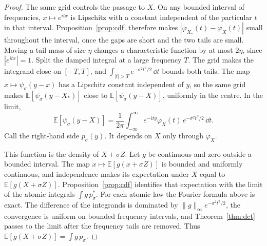 \begin{proof}
The same grid controls the passage to $X$. On any bounded interval of frequencies, $x\mapsto e^{itx}$ is Lipschitz with a constant independent of the particular $t$ in that interval. Proposition~\ref{prop:cdf} therefore makes $|\varphi_{X_*}(t)-\varphi_X(t)|$ small throughout the interval, once the gaps are short and the two tails are small. Moving a tail mass of size $\eta$ changes a characteristic function by at most $2\eta$, since $|e^{itx}|=1$. Split the damped integral at a large frequency $T$. The grid makes the integrand close on $[-T,T]$, and $\int_{|t|>T}e^{-\sigma^2 t^2/2}\,\dd t$ bounds both tails. The map $x\mapsto\psi_\sigma(y-x)$ has a Lipschitz constant independent of $y$, so the same grid makes $\mathbb E[\psi_\sigma(y-X_*)]$ close to $\mathbb E[\psi_\sigma(y-X)]$, uniformly in the centre. In the limit,
\[
 \mathbb E[\psi_\sigma(y-X)]
 =\frac1{2\pi}\int_{-\infty}^{\infty}e^{-ity}\varphi_X(t)\,e^{-\sigma^2 t^2/2}\,\dd t.
\]
Call the right-hand side $p_\sigma(y)$. It depends on $X$ only through $\varphi_X$.

This function is the density of $X+\sigma Z$. Let $g$ be continuous and zero outside a bounded interval. The map $x\mapsto\mathbb E[g(x+\sigma Z)]$ is bounded and uniformly continuous, and independence makes its expectation under $X$ equal to $\mathbb E[g(X+\sigma Z)]$. Proposition~\ref{prop:cdf} identifies that expectation with the limit of the atomic integrals $\int g\,p_\sigma^*$. For each atomic law the Fourier formula above is exact. The difference of the integrands is dominated by $\|g\|_\infty e^{-\sigma^2 t^2/2}$, the convergence is uniform on bounded frequency intervals, and Theorem~\ref{thm:dct} passes to the limit after the frequency tails are removed. Thus $\mathbb E[g(X+\sigma Z)]=\int g\,p_\sigma$.


\end{proof}
